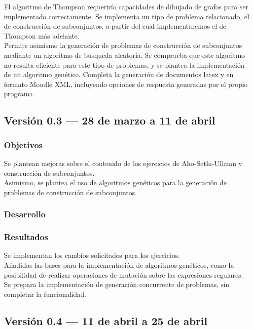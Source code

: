 El algoritmo de Thompson requeriría capacidades de dibujado de grafos para ser implementado correctamente.
Se implementa un tipo de problema relacionado, el de construcción de subconjuntos, a partir del cual implementaremos el de Thompson más adelante.
\\
Permite asimismo la generación de problemas de construcción de subconjuntos mediante un algoritmo de búsqueda aleatoria.
Se comprueba que este algoritmo no resulta eficiente para este tipo de problemas, y se plantea la implementación de un algoritmo genético.
Completa la generación de documentos latex y en formato Moodle XML, incluyendo opciones de respuesta generadas por el propio programa.

\subsection{Versión 0.3 --- 28 de marzo a 11 de abril}

\subsubsection{Objetivos}
Se plantean mejoras sobre el contenido de los ejercicios de Aho-Sethi-Ullman y construcción de subconjuntos.
\\
Asimismo, se plantea el uso de algoritmos genéticos para la generación de problemas de construcción de subconjuntos.

\subsubsection{Desarrollo}

\subsubsection{Resultados}
Se implementan los cambios solicitados para los ejercicios.
\\
Añadidas las bases para la implementación de algoritmos genéticos, como la posibilidad de realizar operaciones de mutación sobre las expresiones regulares.
\\
Se prepara la implementación de generación concurrente de problemas, sin completar la funcionalidad.

\subsection{Versión 0.4 --- 11 de abril a 25 de abril}

